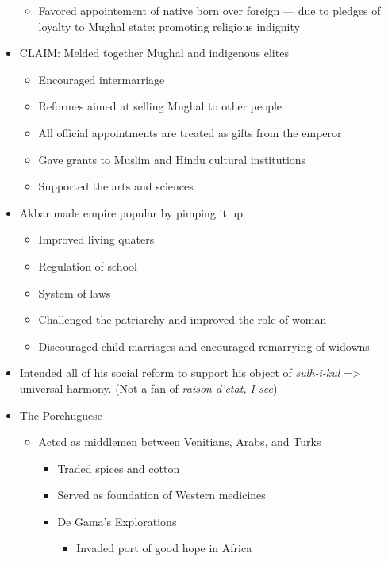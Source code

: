 \documentclass[letterpaper]{article}
\begin{document}
\begin{itemize}
\begin{itemize}
\item Favored appointement of native born over foreign --- due to pledges
of loyalty to Mughal state: promoting religious indignity
\end{itemize}

\item CLAIM: Melded together Mughal and indigenous elites

\begin{itemize}
\item Encouraged intermarriage
\item Reformes aimed at selling Mughal to other people
\item All official appointments are treated as gifts from the emperor
\item Gave grants to Muslim and Hindu cultural institutions
\item Supported the arts and sciences
\end{itemize}

\item Akbar made empire popular by pimping it up

\begin{itemize}
\item Improved living quaters
\item Regulation of school
\item System of laws
\item Challenged the patriarchy and improved the role of woman
\item Discouraged child marriages and encouraged remarrying of widowns
\end{itemize}

\item Intended all of his social reform to support his object of
\emph{sulh-i-kul} => universal harmony. (Not a fan of \emph{raison d'etat, I
see})

\item The Porchuguese

\begin{itemize}
\item Acted as middlemen between Venitians, Arabs, and Turks

\begin{itemize}
\item Traded spices and cotton
\item Served as foundation of Western medicines
\item De Gama's Explorations

\begin{itemize}
\item Invaded port of good hope in Africa


\end{itemize}
\end{itemize}
\end{itemize}
\end{itemize}
\end{document}
